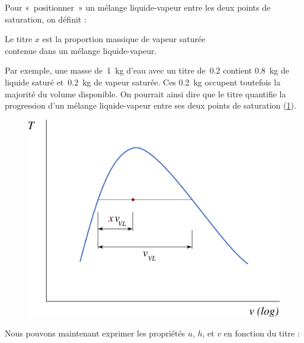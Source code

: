 		Pour «~positionner~» un mélange liquide-vapeur entre les deux points de saturation, on définit  :

		\begin{trucimportant}
		Le titre $x$ est la proportion massique de vapeur saturée\\ contenue dans un mélange liquide-vapeur.
		\end{trucimportant}

		Par exemple, une masse de~\SI{1}{\kilogram} d’eau avec un titre de~\num{0,2} contient \SI{0,8}{\kilogram} de liquide saturé et~\SI{0,2}{\kilogram} de vapeur saturée. Ces \SI{0,2}{\kilogram} occupent toutefois la majorité du volume disponible. On pourrait ainsi dire que le titre quantifie la progression d’un mélange liquide-vapeur entre ses deux points de saturation (\cref{fig_notion_de_titre}).

		\begin{figure}
			\begin{center}
				\includegraphics[width=\didacticpvdiagramwidth]{images/titre_tv_v1.png}
			\end{center}
			\label{fig_notion_de_titre}
		\end{figure}
		
		Nous pouvons maintenant exprimer les propriétés $u$, $h$, et $v$ en fonction du titre :


